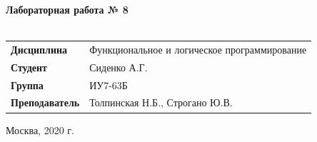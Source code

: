 \documentclass[a4paper,14pt]{extreport} %
\begin{document}
\begin{titlepage}
    \vspace{2cm}

    \begin{center}
        \textbf{Лабораторная работа № 8} \\
        \vspace{0.5cm}
        \textbf{} \\
    \end{center}

    \vspace{4cm}

    \begin{flushleft}
        \begin{tabular}{ll}
            \textbf{Дисциплина} & Функциональное и логическое программирование \\
            \textbf{Студент} & Сиденко А.Г. \\
            \textbf{Группа} & ИУ7-63Б \\
            \textbf{Преподаватель} & Толпинская Н.Б., Строгано Ю.В.  \\
        \end{tabular}
    \end{flushleft}

    \vspace{4cm}

   \begin{center}
        Москва, 2020 г.
    \end{center}

\end{titlepage}
\end{document}
